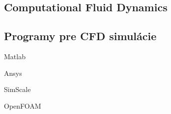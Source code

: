 \documentclass[]{tukediphc}
\begin{document}
\subsection{Computational Fluid Dynamics}

\subsection{Programy pre CFD simulácie}

Matlab

Ansys

SimScale

OpenFOAM

%

%
\end{document}
